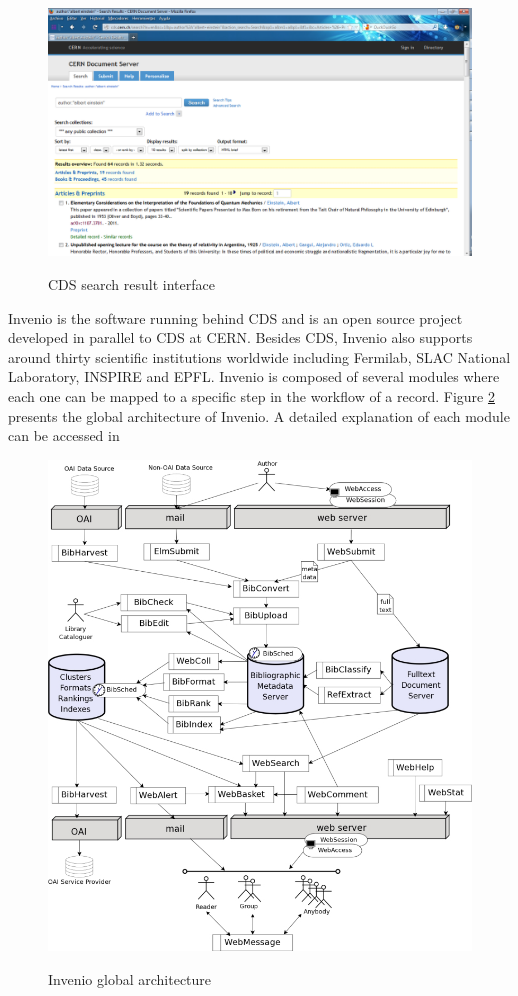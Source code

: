 \begin{figure}
\centering
\includegraphics[height=7 cm]{figures/cds_screenshot.png}
\label{cds_screenshot}
\caption{CDS search result interface}
\end{figure}
 


Invenio\cite{invenio} is the software running behind CDS and is an open source project developed in parallel to CDS at CERN. Besides CDS, Invenio also supports around thirty scientific institutions worldwide including Fermilab, SLAC National Laboratory, INSPIRE and EPFL. 
Invenio is composed of several modules where each one can be mapped to a specific step in the workflow of a record. Figure \ref{invenio_architecture} presents the global architecture of Invenio. A detailed explanation of each module can be accessed in \cite{invenio_modules} 

\begin{figure}
\centering
\includegraphics[height=10 cm]{figures/invenio.jpeg}
\label{invenio_architecture}
\caption{Invenio global architecture}
\end{figure}


